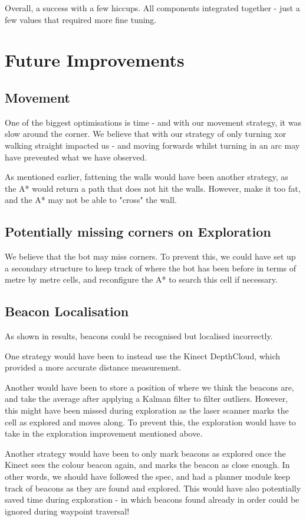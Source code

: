 \documentclass[titlepage,12pt,a4paper]{article}
\begin{document}
Overall, a success with a few hiccups. All components integrated together - just a few values that required more fine tuning.

\pagebreak
\section{Future Improvements}

\subsection*{Movement}
One of the biggest optimisations is time - and with our movement strategy, it was slow around the corner. We believe that with our strategy of only turning xor walking straight impacted us - and moving forwards whilst turning in an arc may have prevented what we have observed. 

As mentioned earlier, fattening the walls would have been another strategy, as the A* would return a path that does not hit the walls. However, make it too fat, and the A* may not be able to "cross" the wall.

\subsection*{Potentially missing corners on Exploration} 
We believe that the bot may miss corners. To prevent this, we could have set up a secondary structure to keep track of where the bot has been before in terms of metre by metre cells, and reconfigure the A* to search this cell if necessary. 

\subsection*{Beacon Localisation}
As shown in results, beacons could be recognised but localised incorrectly.

One strategy would have been to instead use the Kinect DepthCloud, which provided a more accurate distance measurement. 

Another would have been to store a position of where we think the beacons are, and take the average after applying a Kalman filter to filter outliers. However, this might have been missed during exploration as the laser scanner marks the cell as explored and moves along. To prevent this, the exploration would have to take in the exploration improvement mentioned above.

Another strategy would have been to only mark beacons as explored once the Kinect sees the colour beacon again, and marks the beacon as close enough. In other words, we should have followed the spec, and had a planner module keep track of beacons as they are found and explored. This would have also potentially saved time during exploration - in which beacons found already in order could be ignored during waypoint traversal!
\end{document}
